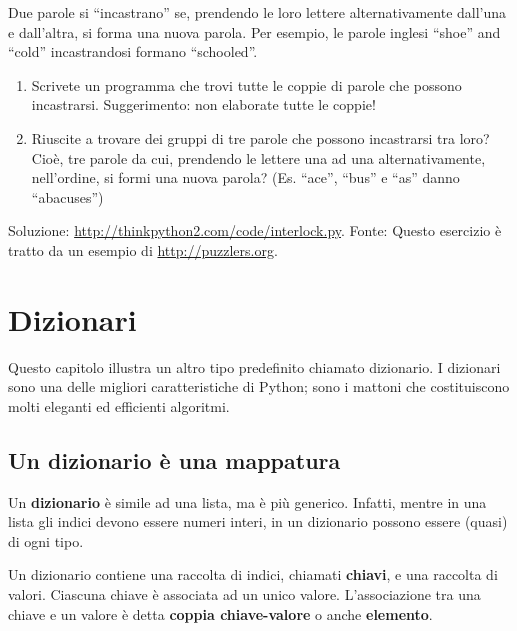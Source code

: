 \documentclass[10pt]{book}
\begin{document}
\vspace{0.2in}
\begin{exercise}

Due parole si ``incastrano'' se, prendendo le loro lettere alternativamente  dall'una e dall'altra, si forma una nuova parola. Per esempio, le parole inglesi ``shoe'' and ``cold'' incastrandosi formano ``schooled''.


\begin{enumerate}

\item Scrivete un programma che trovi tutte le coppie di parole che possono incastrarsi. Suggerimento: non elaborate tutte le coppie!

\item Riuscite a trovare dei gruppi di tre parole che possono incastrarsi tra loro? Cioè, tre parole da cui, prendendo le lettere una ad una alternativamente, nell'ordine, si formi una nuova parola? (Es. ``ace'', ``bus'' e ``as'' danno ``abacuses'')

\end{enumerate}

Soluzione: \url{http://thinkpython2.com/code/interlock.py}.
Fonte: Questo esercizio è tratto da un esempio di \url{http://puzzlers.org}.
\end{exercise}


\chapter{Dizionari}

Questo capitolo illustra un altro tipo predefinito chiamato dizionario. I dizionari sono una delle migliori caratteristiche di Python; sono i mattoni che costituiscono molti eleganti ed efficienti algoritmi.

\section{Un dizionario è una mappatura}
Un {\bf dizionario} è simile ad una lista, ma è più generico. Infatti, mentre in una lista gli indici devono essere numeri interi, in un dizionario possono essere (quasi) di ogni tipo.

Un dizionario contiene una raccolta di indici, chiamati {\bf chiavi}, e una raccolta di valori. Ciascuna chiave è associata ad un unico valore. L'associazione tra una chiave e un valore è detta {\bf coppia chiave-valore} o anche {\bf elemento}.
\end{document}

